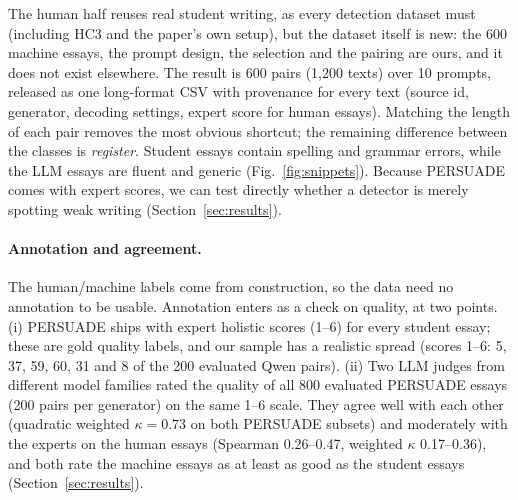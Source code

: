 \documentclass[11pt]{article}
\begin{document}
The human half reuses real student writing, as every detection dataset must (including HC3 and the paper's own setup), but the dataset itself is new: the 600 machine essays, the prompt design, the selection and the pairing are ours, and it does not exist elsewhere. The result is 600 pairs (1{,}200 texts) over 10 prompts, released as one long-format CSV with provenance for every text (source id, generator, decoding settings, expert score for human essays). Matching the length of each pair removes the most obvious shortcut; the remaining difference between the classes is \emph{register}. Student essays contain spelling and grammar errors, while the LLM essays are fluent and generic (Fig.~\ref{fig:snippets}). Because PERSUADE comes with expert scores, we can test directly whether a detector is merely spotting weak writing (Section~\ref{sec:results}).

\begin{table}[t]
\centering\small
\setlength{\tabcolsep}{3pt}
\caption{New datasets. ``Pairs'' is the number available; each experiment uses the first 200. ``Words'' is the mean length after pairing and truncation.}
\label{tab:newdata}
\end{table}

\paragraph{Annotation and agreement.} The human/machine labels come from construction, so the data need no annotation to be usable. Annotation enters as a check on quality, at two points. (i) PERSUADE ships with expert holistic scores (1--6) for every student essay; these are gold quality labels, and our sample has a realistic spread (scores 1--6: 5, 37, 59, 60, 31 and 8 of the 200 evaluated Qwen pairs). (ii) Two LLM judges from different model families rated the quality of all 800 evaluated PERSUADE essays (200 pairs per generator) on the same 1--6 scale. They agree well with each other (quadratic weighted $\kappa=0.73$ on both PERSUADE subsets) and moderately with the experts on the human essays (Spearman 0.26--0.47, weighted $\kappa$ 0.17--0.36), and both rate the machine essays as at least as good as the student essays (Section~\ref{sec:results}).
\end{document}
